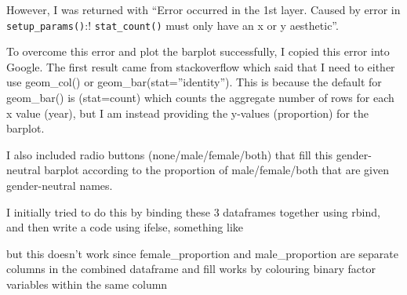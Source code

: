 \documentclass[
]{article}
\newenvironment{Shaded}{\begin{snugshade}}{\end{snugshade}}
\newcommand{\AttributeTok}[1]{\textcolor[rgb]{0.13,0.29,0.53}{#1}}
\newcommand{\ControlFlowTok}[1]{\textcolor[rgb]{0.13,0.29,0.53}{\textbf{#1}}}
\newcommand{\ErrorTok}[1]{\textcolor[rgb]{0.64,0.00,0.00}{\textbf{#1}}}
\newcommand{\FunctionTok}[1]{\textcolor[rgb]{0.13,0.29,0.53}{\textbf{#1}}}
\newcommand{\NormalTok}[1]{#1}
\newcommand{\OtherTok}[1]{\textcolor[rgb]{0.56,0.35,0.01}{#1}}
\newcommand{\SpecialCharTok}[1]{\textcolor[rgb]{0.81,0.36,0.00}{\textbf{#1}}}
\begin{document}
However, I was returned with ``Error occurred in the 1st layer. Caused
by error in \texttt{setup\_params()}:! \texttt{stat\_count()} must only
have an x or y aesthetic''.

To overcome this error and plot the barplot successfully, I copied this
error into Google. The first result came from stackoverflow which said
that I need to either use geom\_col() or geom\_bar(stat=''identity'').
This is because the default for geom\_bar() is (stat=count) which counts
the aggregate number of rows for each x value (year), but I am instead
providing the y-values (proportion) for the barplot.

I also included radio buttons (none/male/female/both) that fill this
gender-neutral barplot according to the proportion of male/female/both
that are given gender-neutral names.

I initially tried to do this by binding these 3 dataframes together
using rbind, and then write a code using ifelse, something like

\begin{Shaded}
\end{Shaded}

but this doesn't work since female\_proportion and male\_proportion are
separate columns in the combined dataframe and fill works by colouring
binary factor variables within the same column
\end{document}
